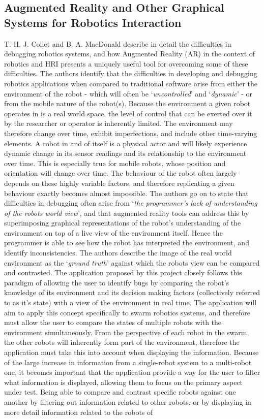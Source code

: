 \documentclass[titlepage,hidelinks,10pt]{article}
\begin{document}
\subsection{Augmented Reality and Other Graphical Systems for Robotics Interaction} \label{VRAndAR}
T. H. J. Collet and B. A. MacDonald describe in detail the difficulties in debugging robotics systems, and how Augmented Reality (AR) in the context of robotics and HRI presents a uniquely useful tool for overcoming some of these difficulties\cite{AugmentedRealityDebuggingSystem}. The authors identify that the difficulties in developing and debugging robotics applications when compared to traditional software arise from either the environment of the robot - which will often be `\textit{uncontrolled}' and `\textit{dynamic}' - or from the mobile nature of the robot(s). Because the environment a given robot operates in is a real world space, the level of control that can be exerted over it by the researcher or operator is inherently limited. The environment may therefore change over time, exhibit imperfections, and include other time-varying elements. A robot in and of itself is a physical actor and will likely experience dynamic change in its sensor readings and its relationship to the environment over time. This is especially true for mobile robots, whose position and orientation will change over time. The behaviour of the robot often largely depends on these highly variable factors, and therefore replicating a given behaviour exactly becomes almost impossible. The authors go on to state that difficulties in debugging often arise from `\textit{the programmer's lack of understanding of the robots world view}', and that augmented reality tools can address this by superimposing graphical representations of the robot's understanding of the environment on top of a live view of the environment itself. Hence the programmer is able to see how the robot has interpreted the environment, and identify inconsistencies. The authors describe the image of the real world environment as the `\textit{ground truth}' against which the robots view can be compared and contrasted. The application proposed by this project closely follows this paradigm of allowing the user to identify bugs by comparing the robot's knowledge of its environment and its decision making factors (collectively referred to as it's state) with a view of the environment in real time. The application will aim to apply this concept specifically to swarm robotics systems, and therefore must allow the user to compare the states of multiple robots with the environment simultaneously. From the perspective of each robot in the swarm, the other robots will inherently form part of the environment, therefore the application must take this into account when displaying the information. Because of the large increase in information from a single-robot system to a multi-robot one, it becomes important that the application provide a way for the user to filter what information is displayed, allowing them to focus on the primary aspect under test. Being able to compare and contrast specific robots against one another by filtering out information related to other robots, or by displaying in more detail information related to the robots of 
\end{document}
